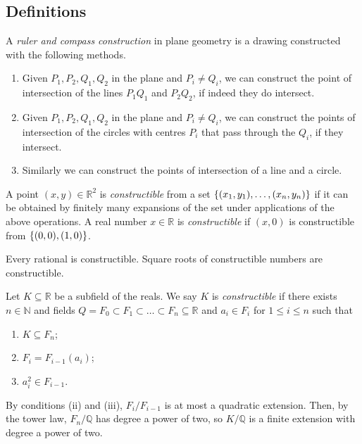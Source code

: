 \subsection{Definitions}
\begin{definition}
	A \emph{ruler and compass construction} in plane geometry is a drawing constructed with the following methods.
	\begin{enumerate}
		\item Given \( P_1, P_2, Q_1, Q_2 \) in the plane and \( P_i \neq Q_i \), we can construct the point of intersection of the lines \( P_1Q_1 \) and \( P_2Q_2 \), if indeed they do intersect.
		\item Given \( P_1, P_2, Q_1, Q_2 \) in the plane and \( P_i \neq Q_i \), we can construct the points of intersection of the circles with centres \( P_i \) that pass through the \( Q_i \), if they intersect.
		\item Similarly we can construct the points of intersection of a line and a circle.
	\end{enumerate}
	A point \( (x,y) \in \mathbb R^2 \) is \emph{constructible} from a set \( \qty{(x_1, y_1), \dots, (x_n, y_n)} \) if it can be obtained by finitely many expansions of the set under applications of the above operations.
	A real number \( x \in \mathbb R \) is \emph{constructible} if \( (x,0) \) is constructible from \( \qty{(0,0), (1,0)} \).
\end{definition}
\begin{remark}
	Every rational is constructible.
	Square roots of constructible numbers are constructible.
\end{remark}
\begin{definition}
	Let \( K \subseteq \mathbb R \) be a subfield of the reals.
	We say \( K \) is \emph{constructible} if there exists \( n \in \mathbb N \) and fields \( Q = F_0 \subset F_1 \subset \dots \subset F_n \subseteq \mathbb R \) and \( a_i \in F_i \) for \( 1 \leq i \leq n \) such that
	\begin{enumerate}
		\item \( K \subseteq F_n \);
		\item \( F_i = F_{i-1}(a_i) \);
		\item \( a_i^2 \in F_{i-1} \).
	\end{enumerate}
\end{definition}
\begin{remark}
	By conditions (ii) and (iii), \( F_i / F_{i-1} \) is at most a quadratic extension.
	Then, by the tower law, \( F_n / \mathbb Q \) has degree a power of two, so \( K / \mathbb Q \) is a finite extension with degree a power of two.
\end{remark}
